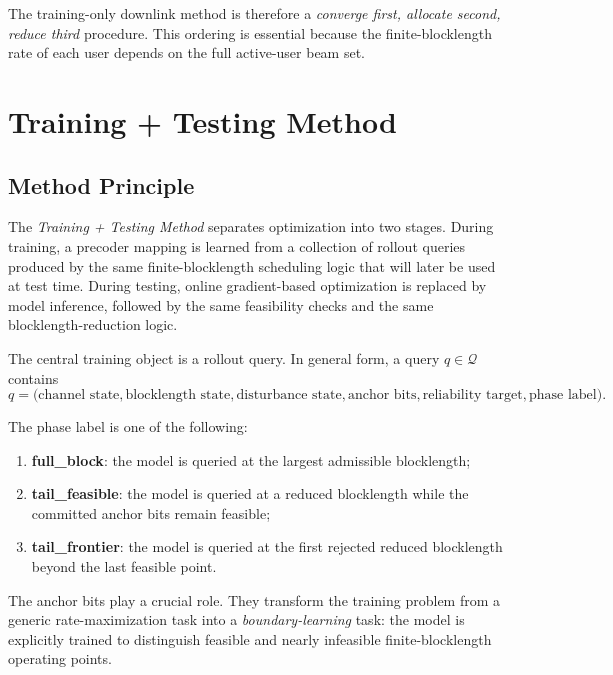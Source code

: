 \documentclass[11pt]{article}
\newcommand{\Qset}{\mathcal{Q}}
\begin{document}
The training-only downlink method is therefore a \emph{converge first, allocate
second, reduce third} procedure. This ordering is essential because the
finite-blocklength rate of each user depends on the full active-user beam set.

\section{Training + Testing Method}

\subsection{Method Principle}

The \emph{Training + Testing Method} separates optimization into two stages.
During training, a precoder mapping is learned from a collection of rollout
queries produced by the same finite-blocklength scheduling logic that will later
be used at test time. During testing, online gradient-based optimization is
replaced by model inference, followed by the same feasibility checks and the
same blocklength-reduction logic.

The central training object is a rollout query. In general form, a query
$q\in\Qset$ contains
\begin{equation}
q
=
\bigl(
\text{channel state},
\text{blocklength state},
\text{disturbance state},
\text{anchor bits},
\text{reliability target},
\text{phase label}
\bigr).
\label{eq:general-rollout-query}
\end{equation}

The phase label is one of the following:
\begin{enumerate}
    \item \textbf{full\_block}: the model is queried at the largest admissible blocklength;
    \item \textbf{tail\_feasible}: the model is queried at a reduced blocklength while the committed anchor bits remain feasible;
    \item \textbf{tail\_frontier}: the model is queried at the first rejected reduced blocklength beyond the last feasible point.
\end{enumerate}

The anchor bits play a crucial role. They transform the training problem from a
generic rate-maximization task into a \emph{boundary-learning} task: the model
is explicitly trained to distinguish feasible and nearly infeasible
finite-blocklength operating points.
\end{document}
